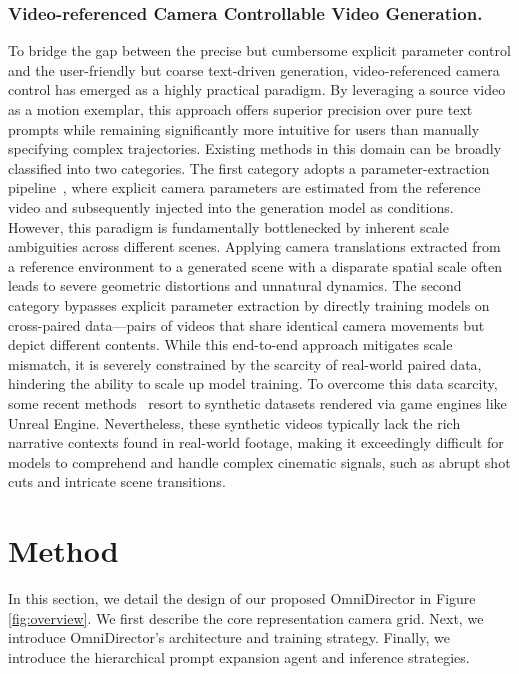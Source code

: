 \documentclass{llmxive}
\begin{document}
\subsubsection{Video-referenced Camera Controllable Video Generation.} To bridge the gap between the precise but cumbersome explicit parameter control and the user-friendly but coarse text-driven generation, video-referenced camera control has emerged as a highly practical paradigm. By leveraging a source video as a motion exemplar, this approach offers superior precision over pure text prompts while remaining significantly more intuitive for users than manually specifying complex trajectories. Existing methods in this domain can be broadly classified into two categories. The first category adopts a parameter-extraction pipeline~\cite{wang2024motionctrl, he2024cameractrl, xu2024camco, zheng2024cami2v}, where explicit camera parameters are estimated from the reference video and subsequently injected into the generation model as conditions. However, this paradigm is fundamentally bottlenecked by inherent scale ambiguities across different scenes. Applying camera translations extracted from a reference environment to a generated scene with a disparate spatial scale often leads to severe geometric distortions and unnatural dynamics.
The second category bypasses explicit parameter extraction by directly training models on cross-paired data—pairs of videos that share identical camera movements but depict different contents. While this end-to-end approach \cite{luo2025camclonemaster, ling2024motionclone, hu2024motionmaster} mitigates scale mismatch, it is severely constrained by the scarcity of real-world paired data, hindering the ability to scale up model training. To overcome this data scarcity, some recent methods~\cite{li2024director3d, he2025cameractrlii} resort to synthetic datasets rendered via game engines like Unreal Engine. Nevertheless, these synthetic videos typically lack the rich narrative contexts found in real-world footage, making it exceedingly difficult for models to comprehend and handle complex cinematic signals, such as abrupt shot cuts and intricate scene transitions.
\vspace{-0.5cm}

\section{Method}

In this section, we detail the design of our proposed OmniDirector in Figure \ref{fig:overview}. We first describe the core representation camera grid. Next, we introduce OmniDirector’s architecture and training strategy. Finally, we introduce the hierarchical prompt expansion agent and inference strategies.
\end{document}
